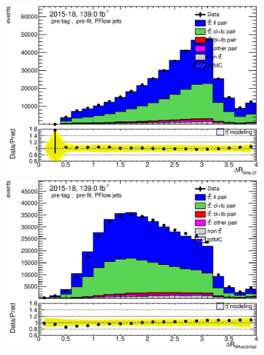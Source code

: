 \documentclass[letterpaper,12pt]{article}
\begin{document}
\begin{figure}
\begin{minipage}[b]{.45\textwidth}
	\end{minipage}\hfill
	\begin{minipage}[b]{.45\textwidth}
	\centering
	\includegraphics[width=1\textwidth]{Oct_distributions/pretagNoRwDL1rwithhighpTPFlow_scaledall/DataMC_dRblepq1.eps} 
	\end{minipage}\hfill
	\begin{minipage}[b]{.45\textwidth}
	\centering
	\includegraphics[width=1\textwidth]{Oct_distributions/pretagNoRwDL1rwithhighpTPFlow_scaledall/DataMC_dRWhadbhad.eps} 
	\end{minipage}\hfill
	\begin{minipage}[b]{.45\textwidth}
	\centering

\end{minipage}
\end{figure}
\end{document}
